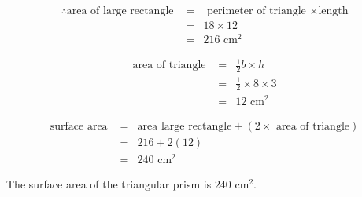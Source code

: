 \begin{wex}
{\begin{equation*}
\begin{array}{rcl}
\end{array}
\end{equation*}

\begin{equation*}
\begin{array}{rcl}
 \therefore \mbox{area of large rectangle }&=& \mbox{ perimeter of triangle }\times \mbox{length}\\
&=& 18 \times 12 \\
&=&216 \mbox{ cm}^2
\end{array}
\end{equation*}




\begin{equation*}
\begin{array}{rcl}
\mbox{area of triangle } &= &\frac{1}{2}b \times h\\
&=&\frac{1}{2} \times 8 \times 3\\
&=&12 \mbox{ cm}^2
\end{array}
\end{equation*}




\begin{equation*}
\begin{array}{rcl}
 \mbox{surface area }&=& \mbox{area large rectangle}  + (2\times \mbox{  area of triangle})\\
&=& 216 + 2(12) \\
&=& 240\mbox{ cm}^2
\end{array}
\end{equation*}

The surface area of the triangular prism is $240$ cm$^2$.

}
\end{wex}



